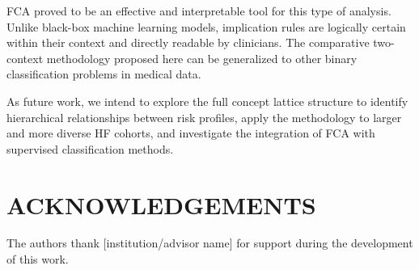 \documentclass[a4paper,twoside]{article}
\begin{document}
FCA proved to be an effective and interpretable tool for this type of analysis. Unlike black-box machine learning models, implication rules are logically certain within their context and directly readable by clinicians. The comparative two-context methodology proposed here can be generalized to other binary classification problems in medical data.

As future work, we intend to explore the full concept lattice structure to identify hierarchical relationships between risk profiles, apply the methodology to larger and more diverse HF cohorts, and investigate the integration of FCA with supervised classification methods.

\section*{\uppercase{Acknowledgements}}

The authors thank [institution/advisor name] for support during the development of this work.


{\small
}
\end{document}
